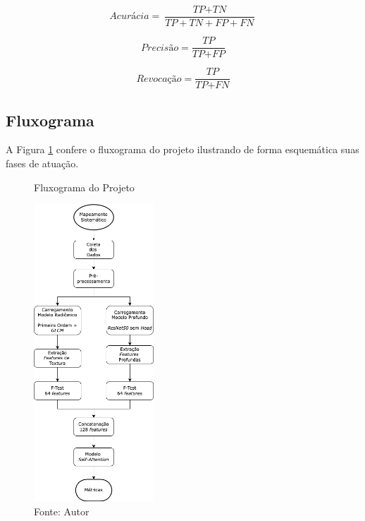 \begin{equation}
\textit{Acurácia} = \frac{\textit{TP} + \textit{TN}}{\textit{TP} + \textit{TN} + \textit{FP} + \textit{FN}}
\label{eq:acc}
\end{equation}

\begin{equation}
\textit{Precisão} = \frac{\textit{TP}}{\textit{TP} + \textit{FP}}
\label{eq:precision}
\end{equation}

\begin{equation}
\textit{Revocação} = \frac{\textit{TP}}{\textit{TP} + \textit{FN}}
\label{eq:recall}
\end{equation}

\subsection{Fluxograma}
\label{subsec:cap4_floxugrama}

A Figura \ref{fig:fig015} confere o fluxograma do projeto ilustrando de forma esquemática suas fases de atuação.


\begin{figure}[h!]
    \centering
    \caption{Fluxograma do Projeto}
    \includegraphics[width=0.4\textwidth]{figures/fig015.png}
    \caption*{Fonte: Autor}
    \label{fig:fig015}
\end{figure}

